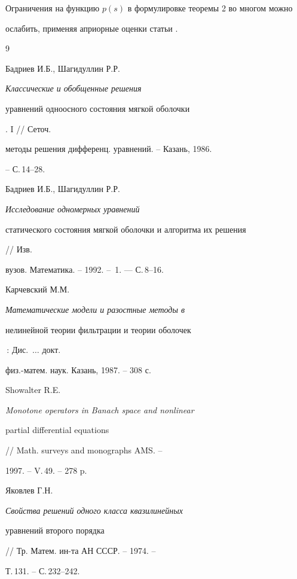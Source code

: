  


\begin{notenonum} 


Ограничения на функцию $p(s)$ в формулировке теоремы 2 во многом можно 


ослабить, применяя априорные оценки статьи \cite{1}. 


\end{notenonum} 


 


\begin{thebibliography}{9} 


 




Бадриев И.Б., Шагидуллин Р.Р. {\em Классические и обобщенные решения 


уравнений одноосного состояния мягкой оболочки}. I // Сеточ.


методы решения дифференц. уравнений. -- Казань, 1986. 


-- С.\,14--28. 




Бадриев И.Б., Шагидуллин Р.Р. {\em Исследование одномерных уравнений 


статического состояния мягкой оболочки и алгоритма их решения} // Изв. 


вузов. Математика. -- 1992. -- \No\,1. --- С.\,8--16. 




Карчевский М.М. {\em Математические модели и разостные методы в 


нелинейной теории фильтрации и теории оболочек}\,: Дис.~$\dotsc$ докт. 


физ.-матем. наук. Казань, 1987. -- 308 с. 




Showalter R.E. {\em Monotone operators in Banach space and nonlinear 


partial differential equations} // Math. surveys and monographs AMS. -- 


1997. -- V.\,49. -- 278 p. 




Яковлев Г.Н. {\em Свойства решений одного класса квазилинейных 


уравнений второго порядка} // Тр. Матем. ин-та АН СССР. -- 1974. -- 


Т.\,131. -- С.\,232--242. 


 


\end{thebibliography} 


 


\vskip 0.5cm 


 






 


\label{end} 


 


